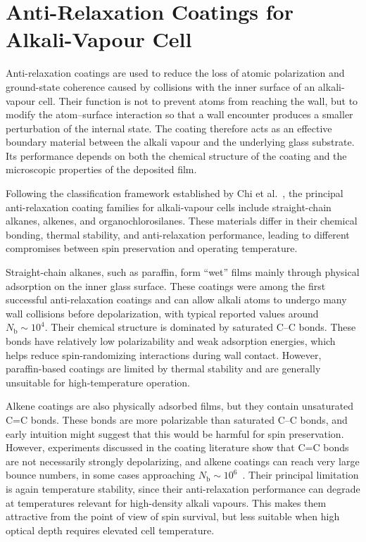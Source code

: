 \chapter{Anti-Relaxation Coatings for Alkali-Vapour Cell}
\label{app:anti_relaxation_coatings}
Anti-relaxation coatings are used to reduce the loss of atomic polarization and ground-state coherence caused by collisions with the inner surface of an alkali-vapour cell. Their function is not to prevent atoms from reaching the wall, but to modify the atom--surface interaction so that a wall encounter produces a smaller perturbation of the internal state. The coating therefore acts as an effective boundary material between the alkali vapour and the underlying glass substrate. Its performance depends on both the chemical structure of the coating and the microscopic properties of the deposited film.

Following the classification framework established by Chi et al.~\cite{Aiacoavc_ChiEtAl_2020}, the principal anti-relaxation coating families for alkali-vapour cells include straight-chain alkanes, alkenes, and organochlorosilanes. These materials differ in their chemical bonding, thermal stability, and anti-relaxation performance, leading to different compromises between spin preservation and operating temperature.

Straight-chain alkanes, such as paraffin, form ``wet'' films mainly through physical adsorption on the inner glass surface. These coatings were among the first successful anti-relaxation coatings and can allow alkali atoms to undergo many wall collisions before depolarization, with typical reported values around $N_{\mathrm{b}}\sim10^{4}$. Their chemical structure is dominated by saturated C--C bonds. These bonds have relatively low polarizability and weak adsorption energies, which helps reduce spin-randomizing interactions during wall contact. However, paraffin-based coatings are limited by thermal stability and are generally unsuitable for high-temperature operation.

Alkene coatings are also physically adsorbed films, but they contain unsaturated C=C bonds. These bonds are more polarizable than saturated C--C bonds, and early intuition might suggest that this would be harmful for spin preservation. However, experiments discussed in the coating literature show that C=C bonds are not necessarily strongly depolarizing, and alkene coatings can reach very large bounce numbers, in some cases approaching $N_{\mathrm{b}}\sim10^{6}$~\cite{Aiacoavc_ChiEtAl_2020}. Their principal limitation is again temperature stability, since their anti-relaxation performance can degrade at temperatures relevant for high-density alkali vapours. This makes them attractive from the point of view of spin survival, but less suitable when high optical depth requires elevated cell temperature.

